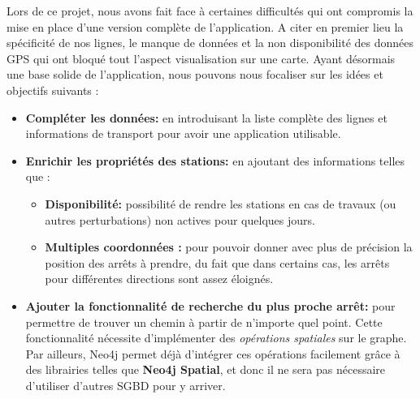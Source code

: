 Lors de ce projet, nous avons fait face à certaines difficultés qui ont compromis la mise en place d'une version complète de l'application. A citer en premier lieu la spécificité de nos lignes, le manque de données et la non disponibilité des données GPS qui ont bloqué tout l'aspect visualisation sur une carte.\newline\newline
Ayant désormais une base solide de l'application, nous pouvons nous focaliser sur les idées et objectifs suivants :
\begin{itemize}
	\item \textbf{Compléter les données:} en introduisant la liste complète des lignes et informations de transport pour avoir une application utilisable.
	
	\item \textbf{Enrichir les propriétés des stations: }en ajoutant des informations telles que :
		\begin{itemize}
			\item \textbf{Disponibilité:} possibilité de rendre les stations en cas de travaux (ou autres perturbations) non actives pour quelques jours.
			\item \textbf{Multiples coordonnées :} pour pouvoir donner avec plus de précision la position des arrêts à prendre, du fait que dans certains cas, les arrêts pour différentes directions sont assez éloignés.
		\end{itemize}
		
	\item \textbf{Ajouter la fonctionnalité de recherche du plus proche arrêt: } pour permettre de trouver un chemin à partir de n'importe quel point. Cette fonctionnalité nécessite d'implémenter des \emph{opérations spatiales} sur le graphe. Par ailleurs, Neo4j permet déjà d'intégrer ces opérations facilement grâce à des librairies telles que \textbf{Neo4j Spatial}, et donc il ne sera pas nécessaire d'utiliser d'autres SGBD pour y arriver.


\end{itemize}
